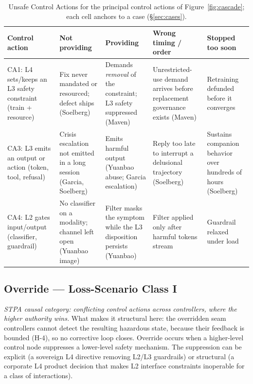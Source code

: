 \documentclass[11pt]{article}
\begin{document}
\begin{table}[!htbp]
\centering
\small
\caption{Unsafe Control Actions for the principal control actions of Figure~\ref{fig:cascade}; each cell anchors to a case (\S\ref{sec:cases}).}
\label{tab:uca}
{\setlength{\tabcolsep}{3pt}
\begin{tabularx}{\columnwidth}{@{}P{2.2cm} Y Y Y Y@{}}
\toprule
\textbf{Control action} & \textbf{Not providing} & \textbf{Providing} & \textbf{Wrong timing / order} & \textbf{Stopped too soon} \\
\midrule
CA1: L4 sets/keeps an L3 safety constraint (train + resource) & Fix never mandated or resourced; defect ships (Soelberg) & Demands \emph{removal} of the constraint; L3 safety suppressed (Maven) & Unrestricted-use demand arrives before replacement governance exists (Maven) & Retraining defunded before it converges \\
CA3: L3 emits an output or action (token, tool, refusal) & Crisis escalation not emitted in a long session (Garcia, Soelberg) & Emits harmful output (Yuanbao abuse; Garcia escalation) & Reply too late to interrupt a delusional trajectory (Soelberg) & Sustains companion behavior over hundreds of hours (Soelberg) \\
CA4: L2 gates input/output (classifier, guardrail) & No classifier on a modality; channel left open (Yuanbao image) & Filter masks the symptom while the L3 disposition persists (Yuanbao) & Filter applied only after harmful tokens stream & Guardrail relaxed under load \\
\bottomrule
\end{tabularx}}
\end{table}

\subsection{Override --- Loss-Scenario Class I}

\emph{STPA causal category: conflicting control actions across controllers, where the higher authority wins.} What makes it structural here: the overridden seam controllers cannot detect the resulting hazardous state, because their feedback is bounded (H-4), so no corrective loop closes. Override occurs when a higher-level control node suppresses a lower-level safety mechanism. The suppression can be explicit (a sovereign L4 directive removing L2/L3 guardrails) or structural (a corporate L4 product decision that makes L2 interface constraints inoperable for a class of interactions).
\end{document}
